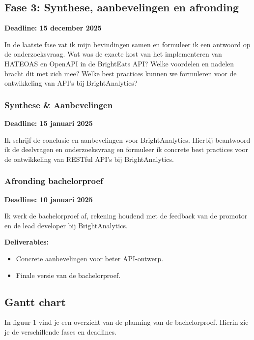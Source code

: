 \subsection{Fase 3: Synthese, aanbevelingen en afronding}

\textbf{Deadline: 15 december 2025}

\bigskip
In de laatste fase vat ik mijn bevindingen samen en formuleer ik een antwoord op de onderzoeksvraag. Wat was de exacte kost van het implementeren van HATEOAS en OpenAPI in de BrightEats API? Welke voordelen en nadelen bracht dit met zich mee? Welke best practices kunnen we formuleren voor de ontwikkeling van API's bij BrightAnalytics?

\subsubsection{Synthese \& Aanbevelingen}

\textbf{Deadline: 15 januari 2025}

\bigskip
Ik schrijf de conclusie en aanbevelingen voor BrightAnalytics. Hierbij beantwoord ik de deelvragen en onderzoeksvraag en formuleer ik concrete best practices voor de ontwikkeling van RESTful API's bij BrightAnalytics.

\subsubsection{Afronding bachelorproef}

\textbf{Deadline: 10 januari 2025}

\bigskip
Ik werk de bachelorproef af, rekening houdend met de feedback van de promotor en de lead developer bij BrightAnalytics.

\textbf{Deliverables:}

\begin{itemize}
  \item Concrete aanbevelingen voor beter API-ontwerp.
  \item Finale versie van de bachelorproef.
\end{itemize}

\subsection{Gantt chart}

In figuur 1 vind je een overzicht van de planning van de bachelorproef. Hierin zie je de verschillende fases en deadlines.

